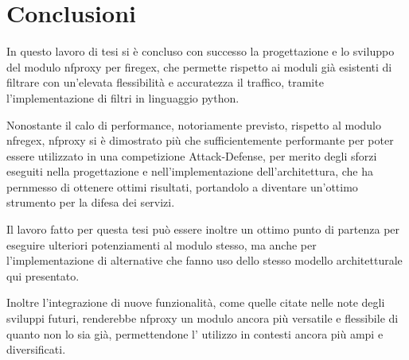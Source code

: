 \chapter*{Conclusioni}\label{chap:ending}

In questo lavoro di tesi si è concluso con successo la progettazione e lo sviluppo del modulo \gls{nfproxy} per firegex, che permette rispetto ai moduli già esistenti di filtrare con un'elevata flessibilità e accuratezza il traffico, tramite l'implementazione di filtri in linguaggio python.

Nonostante il calo di performance, notoriamente previsto, rispetto al modulo \gls{nfregex}, \gls{nfproxy} si è dimostrato più che sufficientemente performante per poter essere utilizzato in una competizione Attack-Defense, per merito degli sforzi eseguiti nella progettazione e nell'implementazione dell'architettura, che ha pernmesso di ottenere ottimi risultati, portandolo a diventare un'ottimo strumento per la difesa dei servizi.

Il lavoro fatto per questa tesi può essere inoltre un ottimo punto di partenza per eseguire ulteriori potenziamenti al modulo stesso, ma anche per l'implementazione di alternative che fanno uso dello stesso modello architetturale qui presentato.

Inoltre l'integrazione di nuove funzionalità, come quelle citate nelle note degli sviluppi futuri, renderebbe \gls{nfproxy} un modulo ancora più versatile e flessibile di quanto non lo sia già, permettendone l' utilizzo in contesti ancora più ampi e diversificati.

